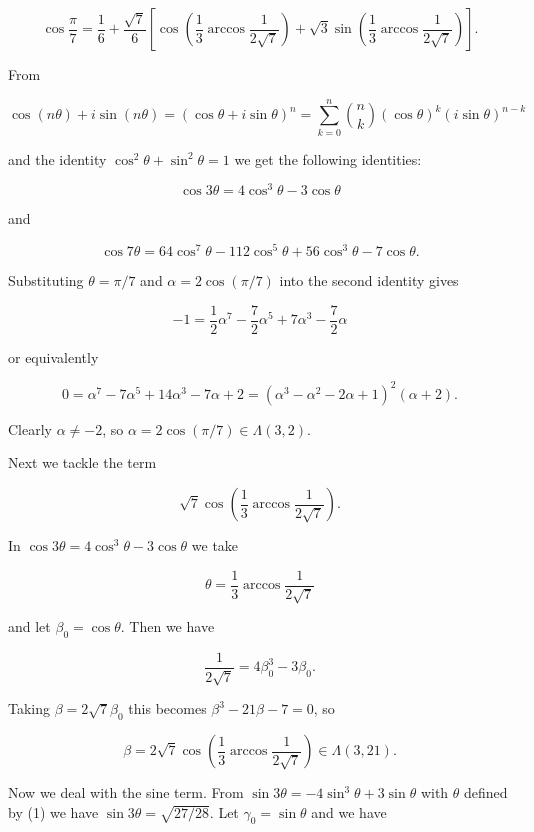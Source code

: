 \documentclass[11pt,letterpaper]{article}
\begin{document}
\[
\cos \frac{\pi}{7}=\frac{1}{6}+\frac{\sqrt{7}}{6}\left[\cos \left(\frac{1}{3} \arccos \frac{1}{2 \sqrt{7}}\right)+\sqrt{3} \sin \left(\frac{1}{3} \arccos \frac{1}{2 \sqrt{7}}\right)\right] .
\]

From

\[
\cos (n \theta)+i \sin (n \theta)=(\cos \theta+i \sin \theta)^{n}=\sum_{k=0}^n\binom{n}{k}(\cos \theta)^{k}(i \sin \theta)^{n-k}
\]

and the identity $\cos ^{2} \theta+\sin ^{2} \theta=1$ we get the following identities:

\[
\cos 3 \theta=4 \cos ^{3} \theta-3 \cos \theta
\]

and

\[
\cos 7 \theta=64 \cos ^{7} \theta-112 \cos ^{5} \theta+56 \cos ^{3} \theta-7 \cos \theta .
\]

Substituting $\theta=\pi/7$ and $\alpha=2 \cos (\pi / 7)$ into the second identity gives

\[
-1=\frac{1}{2} \alpha^{7}-\frac{7}{2} \alpha^{5}+7 \alpha^{3}-\frac{7}{2} \alpha
\]

or equivalently

\[
0=\alpha^{7}-7 \alpha^{5}+14 \alpha^{3}-7 \alpha+2=\left(\alpha^{3}-\alpha^{2}-2 \alpha+1\right)^{2}(\alpha+2) .
\]

Clearly $\alpha \neq-2$, so $\alpha=2 \cos (\pi / 7) \in \Lambda(3,2)$.

Next we tackle the term

\[
\sqrt{7} \cos \left(\frac{1}{3} \arccos \frac{1}{2 \sqrt{7}}\right) .
\]

In $\cos 3 \theta=4 \cos ^{3} \theta-3 \cos \theta$ we take


\begin{equation*}
\theta=\frac{1}{3} \arccos \frac{1}{2 \sqrt{7}} \tag{1}\label{eq:1}
\end{equation*}


and let $\beta_{0}=\cos \theta$. Then we have

\[
\frac{1}{2 \sqrt{7}}=4 \beta_{0}^{3}-3 \beta_{0} .
\]

Taking $\beta=2 \sqrt{7} \beta_{0}$ this becomes $\beta^{3}-21 \beta-7=0$, so

\[
\beta=2 \sqrt{7} \cos \left(\frac{1}{3} \arccos \frac{1}{2 \sqrt{7}}\right) \in \Lambda(3,21) .
\]

Now we deal with the sine term. From $\sin 3 \theta=-4 \sin ^{3} \theta+3 \sin \theta$ with $\theta$ defined by (1) we have $\sin 3 \theta=\sqrt{27 / 28}$. Let $\gamma_{0}=\sin \theta$ and we have
\end{document}
